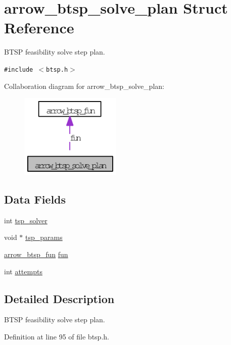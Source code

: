 \hypertarget{structarrow__btsp__solve__plan}{
\section{arrow\_\-btsp\_\-solve\_\-plan Struct Reference}
\label{structarrow__btsp__solve__plan}
}
BTSP feasibility solve step plan.  


{\tt \#include $<$btsp.h$>$}

Collaboration diagram for arrow\_\-btsp\_\-solve\_\-plan:\nopagebreak
\begin{figure}[H]
\begin{center}
\leavevmode
\includegraphics[width=136pt]{structarrow__btsp__solve__plan__coll__graph}
\end{center}
\end{figure}
\subsection*{Data Fields}
\begin{CompactItemize}
\item 
int \hyperlink{structarrow__btsp__solve__plan_911facf12673ddb5c3eb024fa12ee18d}{tsp\_\-solver}
\item 
void $\ast$ \hyperlink{structarrow__btsp__solve__plan_2b7cf65583f45c990218139dbae34ae5}{tsp\_\-params}
\item 
\hyperlink{structarrow__btsp__fun}{arrow\_\-btsp\_\-fun} \hyperlink{structarrow__btsp__solve__plan_89fa2ad1bcc026cd50fd7abc6c30ce3e}{fun}
\item 
int \hyperlink{structarrow__btsp__solve__plan_acfa3d4257a33548a9f60ee568219bc5}{attempts}
\end{CompactItemize}


\subsection{Detailed Description}
BTSP feasibility solve step plan. 

Definition at line 95 of file btsp.h.

